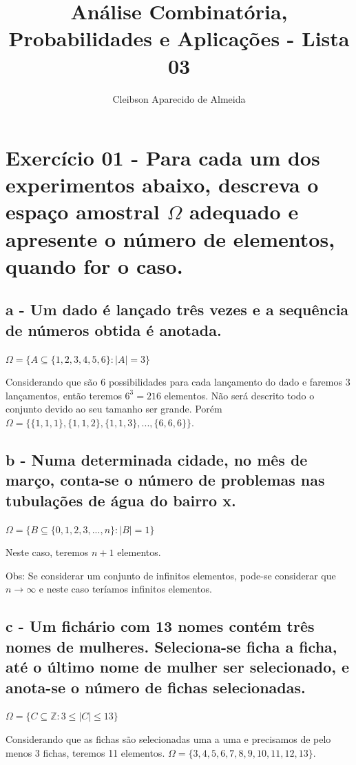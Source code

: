 \documentclass[12pt]{article}
\title{Análise Combinatória, Probabilidades e Aplicações - Lista 03}
\author{{Cleibson Aparecido de Almeida}}
\begin{document}
\maketitle

\section*{Exercício 01 - Para cada um dos experimentos abaixo, descreva o espaço amostral $\Omega$ adequado e apresente o número de elementos, quando for o caso.}


\subsection*{a - Um dado é lançado três vezes e a sequência de números obtida é anotada.}

$\Omega = \{A \subseteq \{1,2,3,4,5,6\}: |A|=3\}$

Considerando que são 6 possibilidades para cada lançamento do dado e faremos 3 lançamentos, então teremos $6^3=216$ elementos. Não será descrito todo o conjunto devido ao seu tamanho ser grande. Porém $\Omega = \{ \{1,1,1 \}, \{1,1,2 \}, \{1,1,3 \},..., \{6,6,6 \} \}$.

\subsection*{b - Numa determinada cidade, no mês de março, conta-se o número de problemas nas tubulações de água do bairro x.}

$\Omega = \{B \subseteq \{0,1,2,3,...,n\}: |B|=1\}$

Neste caso, teremos $n+1$ elementos. 

Obs: Se considerar um conjunto de infinitos elementos, pode-se considerar que $n \rightarrow \infty$ e neste caso teríamos infinitos elementos.

\subsection*{c  - Um fichário com 13 nomes contém três nomes de mulheres. Seleciona-se ficha a ficha, até o último nome de mulher ser selecionado, e anota-se o número de fichas selecionadas.}

$\Omega = \{C \subseteq \mathbb{Z}: 3 \leq |C| \leq 13\}$

Considerando que as fichas são selecionadas uma a uma e precisamos de pelo menos 3 fichas, teremos 11 elementos. $\Omega = \{3,4,5,6,7,8,9,10,11,12,13\}$.
\end{document}
